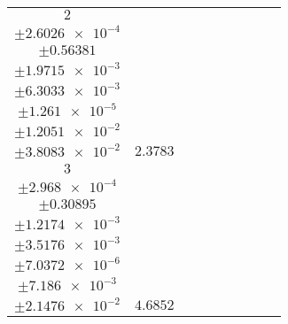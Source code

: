 \documentclass[8pt]{article}
\begin{document}
\begin{longtable}[l]{c c c c c c c c c}
$\num{2}$ & \begin{tabular}[c]{@{}c@{}}$\num{2.7562e-2}$ \\ $\pm\num{2.6026e-4}$\end{tabular} & \begin{tabular}[c]{@{}c@{}}$\num{-0.76663}$ \\ $\pm\num{0.56381}$\end{tabular} & \begin{tabular}[c]{@{}c@{}}$\num{-6.9249}$ \\ $\pm\num{1.9715e-3}$\end{tabular} & \begin{tabular}[c]{@{}c@{}}$\num{3.5406e+3}$ \\ $\pm\num{6.3033e-3}$\end{tabular} & \begin{tabular}[c]{@{}c@{}}$\num{7.0831}$ \\ $\pm\num{1.261e-5}$\end{tabular} & \begin{tabular}[c]{@{}c@{}}$\num{1.1356}$ \\ $\pm\num{1.2051e-2}$\end{tabular} & \begin{tabular}[c]{@{}c@{}}$\num{4.0786}$ \\ $\pm\num{3.8083e-2}$\end{tabular} & $\num{2.3783}$\\
$\num{3}$ & \begin{tabular}[c]{@{}c@{}}$\num{5.7559e-2}$ \\ $\pm\num{2.968e-4}$\end{tabular} & \begin{tabular}[c]{@{}c@{}}$\num{0.73628}$ \\ $\pm\num{0.30895}$\end{tabular} & \begin{tabular}[c]{@{}c@{}}$\num{-0.49569}$ \\ $\pm\num{1.2174e-3}$\end{tabular} & \begin{tabular}[c]{@{}c@{}}$\num{3.547e+3}$ \\ $\pm\num{3.5176e-3}$\end{tabular} & \begin{tabular}[c]{@{}c@{}}$\num{7.0959}$ \\ $\pm\num{7.0372e-6}$\end{tabular} & \begin{tabular}[c]{@{}c@{}}$\num{1.3113}$ \\ $\pm\num{7.186e-3}$\end{tabular} & \begin{tabular}[c]{@{}c@{}}$\num{4.299}$ \\ $\pm\num{2.1476e-2}$\end{tabular} & $\num{4.6852}$\\

\end{longtable}
\end{document}
